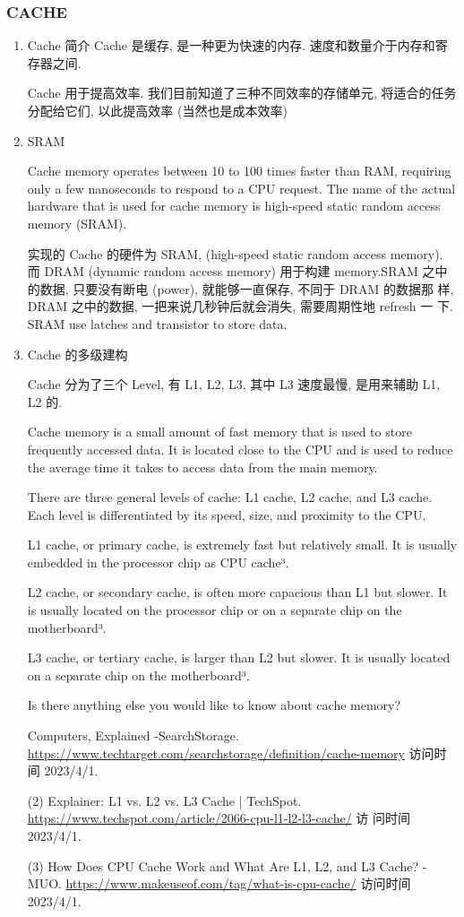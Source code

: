 \documentclass[11pt]{ctexart}
\begin{document}
\subsubsection{CACHE}
\label{sec:org4420c6d}
\begin{enumerate}
\item Cache 简介
\label{sec:orgcc1cbef}
Cache 是缓存, 是一种更为快速的内存. 速度和数量介于内存和寄存器之间. 

Cache 用于提高效率. 我们目前知道了三种不同效率的存储单元, 将适合的任务
分配给它们, 以此提高效率 (当然也是成本效率)
\item SRAM
\label{sec:org0e3448b}

Cache memory operates between 10 to 100 times faster than RAM,
requiring only a few nanoseconds to respond to a CPU request. The name
of the actual hardware that is used for cache memory is high-speed
static random access memory (SRAM).

实现的 Cache 的硬件为 SRAM, (high-speed static random access
memory). 而 DRAM (dynamic random access memory) 用于构建 memory.SRAM
之中的数据, 只要没有断电 (power), 就能够一直保存, 不同于 DRAM 的数据那
样, DRAM 之中的数据, 一把来说几秒钟后就会消失, 需要周期性地 refresh 一
下. SRAM use latches and transistor to store data.  
\item Cache 的多级建构
\label{sec:orgb2469a0}

Cache 分为了三个 Level, 有 L1, L2, L3, 其中 L3 速度最慢, 是用来辅助
L1, L2 的.

Cache memory is a small amount of fast memory that is used to store
frequently accessed data. It is located close to the CPU and is used
to reduce the average time it takes to access data from the main
memory. 

There are three general levels of cache: L1 cache, L2 cache, and L3
cache. Each level is differentiated by its speed, size, and proximity
to the CPU. 

L1 cache, or primary cache, is extremely fast but relatively small. It
is usually embedded in the processor chip as CPU cache³. 

L2 cache, or secondary cache, is often more capacious than L1 but
slower. It is usually located on the processor chip or on a separate
chip on the motherboard³. 

L3 cache, or tertiary cache, is larger than L2 but slower. It is
usually located on a separate chip on the motherboard³. 

Is there anything else you would like to know about cache memory?

Computers, Explained -SearchStorage. \url{https://www.techtarget.com/searchstorage/definition/cache-memory}
访问时间 2023/4/1.

(2) Explainer: L1 vs. L2 vs. L3 Cache |
TechSpot. \url{https://www.techspot.com/article/2066-cpu-l1-l2-l3-cache/} 访
问时间 2023/4/1.

(3) How Does CPU Cache Work and What Are L1, L2, and L3 Cache? -
MUO. \url{https://www.makeuseof.com/tag/what-is-cpu-cache/} 访问时间
2023/4/1.
\end{enumerate}
\end{document}
